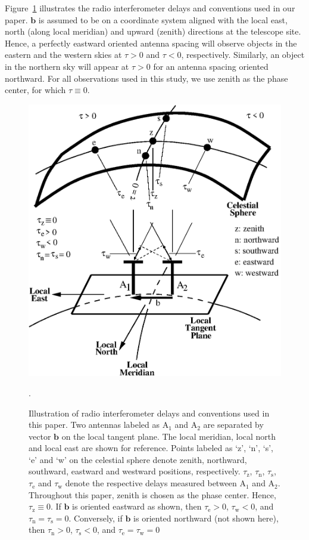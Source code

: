 \documentclass[preprint2,iop,numberedappendix,twocolappendix,appendixfloats]{emulateapj}
\begin{document}
Figure~\ref{fig:delay-cartoon} illustrates the radio interferometer delays and conventions used in our paper. $\boldsymbol{b}$ is assumed to be on a coordinate system aligned with the local east, north (along local meridian) and upward (zenith) directions at the telescope site. Hence, a perfectly eastward oriented antenna spacing will observe objects in the eastern and the western skies at $\tau>0$ and $\tau<0$, respectively. Similarly, an object in the northern sky will appear at $\tau>0$ for an antenna spacing oriented northward. For all observations used in this study, we use zenith as the phase center, for which $\tau\equiv 0$. 

\begin{figure}[htb]
\centering
\includegraphics[width=\linewidth]{figureA1.eps}
\caption{Illustration of radio interferometer delays and conventions used in this paper. Two antennas labeled as A$_1$ and A$_2$ are separated by vector $\boldsymbol{b}$ on the local tangent plane. The local meridian, local north and local east are shown for reference. Points labeled as `z', `n', `s', `e' and `w' on the celestial sphere denote zenith, northward, southward, eastward and westward positions, respectively. $\tau_\textrm{z}$, $\tau_\textrm{n}$, $\tau_\textrm{s}$, $\tau_\textrm{e}$ and $\tau_\textrm{w}$ denote the respective delays measured between A$_1$ and A$_2$. Throughout this paper, zenith is chosen as the phase center. Hence, $\tau_\textrm{z}\equiv 0$. If $\boldsymbol{b}$ is oriented eastward as shown, then $\tau_\textrm{e} > 0$, $\tau_\textrm{w} < 0$, and $\tau_\textrm{n}=\tau_\textrm{s}=0$. Conversely, if $\boldsymbol{b}$ is oriented northward (not shown here), then $\tau_\textrm{n} > 0$, $\tau_\textrm{s} < 0$, and $\tau_\textrm{e}=\tau_\textrm{w}=0$}. \label{fig:delay-cartoon}
\end{figure}
\end{document}
